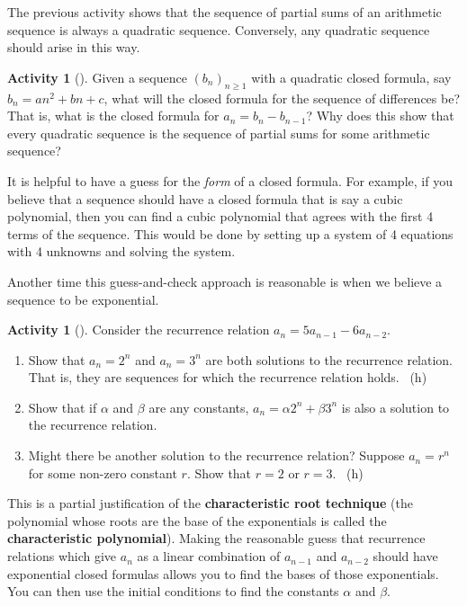 \documentclass[10pt,]{book}
\newcommand{\terminology}[1]{\textbf{#1}}
\theoremstyle{plain}
\theoremstyle{definition}
\theoremstyle{definition}
\theoremstyle{definition}
\newtheorem{activity}[project]{Activity}
\numberwithin{equation}{chapter}
\begin{document}
\hypertarget{p-942}{}%
The previous activity shows that the sequence of partial sums of an arithmetic sequence is always a quadratic sequence.  Conversely, any quadratic sequence should arise in this way.%
\begin{activity}[]\label{activity-140}
\hypertarget{p-943}{}%
Given a sequence \((b_n)_{n \ge 1}\) with a quadratic closed formula, say \(b_n = an^2 + bn + c\), what will the closed formula for the sequence of differences be?  That is, what is the closed formula for \(a_n = b_n - b_{n-1}\)?  Why does this show that every quadratic sequence is the sequence of partial sums for some arithmetic sequence?%
\end{activity}
\hypertarget{p-944}{}%
It is helpful to have a guess for the \emph{form} of a closed formula.  For example, if you believe that a sequence should have a closed formula that is say a cubic polynomial, then you can find a cubic polynomial that agrees with the first 4 terms of the sequence.  This would be done by setting up a system of 4 equations with 4 unknowns and solving the system.%
\par
\hypertarget{p-945}{}%
Another time this guess-and-check approach is reasonable is when we believe a sequence to be exponential.%
\begin{activity}[]\label{activity-141}
\hypertarget{p-946}{}%
Consider the recurrence relation \(a_n = 5a_{n-1} - 6a_{n-2}\).%
\begin{enumerate}[font=\bfseries,label=(\alph*),ref=\alph*]
\item\label{task-180} \hypertarget{p-947}{}%
Show that \(a_n = 2^n\) and \(a_n = 3^n\) are both solutions to the recurrence relation.  That is, they are sequences for which the recurrence relation holds.%
~{\tiny (h)}\item\label{task-181} \hypertarget{p-949}{}%
Show that if \(\alpha\) and \(\beta\) are any constants, \(a_n = \alpha 2^n + \beta 3^n\) is also a solution to the recurrence relation.%
\item\label{task-182} \hypertarget{p-950}{}%
Might there be another solution to the recurrence relation?  Suppose \(a_n = r^n\) for some non-zero constant \(r\).  Show that \(r = 2\) or \(r = 3\).%
~{\tiny (h)}\end{enumerate}
\end{activity}
\hypertarget{p-952}{}%
This is a partial justification of the \terminology{characteristic root technique} (the polynomial whose roots are the base of the exponentials is called the \terminology{characteristic polynomial}).  Making the reasonable guess that recurrence relations which give \(a_n\) as a linear combination of \(a_{n-1}\) and \(a_{n-2}\) should have exponential closed formulas allows you to find the bases of those exponentials.  You can then use the initial conditions to find the constants \(\alpha\) and \(\beta\).%
\end{document}
